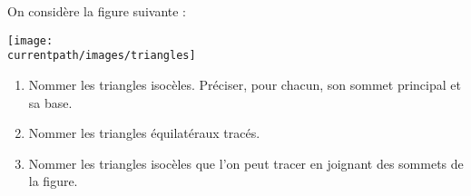 \begin{exercice}
    On considère la figure suivante :
    \begin{center}
      \texttt{[image: \\currentpath/images/triangles]}
    \end{center}
    \vspace*{-8mm}
    \begin{enumerate}
       \item Nommer les triangles isocèles. Préciser, pour chacun, son sommet principal et sa base.
       \item Nommer les triangles équilatéraux tracés.
       \item Nommer les triangles isocèles que l'on peut tracer en joignant des sommets de la figure.
    \end{enumerate}
    \vspace*{-7mm}
\end{exercice}
 